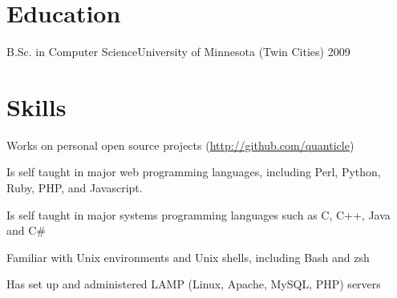 \documentclass[letterpaper]{article}
\newenvironment{resume-list}
{\begin{itemize}
 \setlength{\itemsep}{0pt}
 \setlength{\parskip}{0pt}}
{\end{itemize}}
\begin{document}
\section*{Education}
\noindent B.Sc. in Computer Science\dotfill University of Minnesota (Twin Cities) 2009\\
\section*{Skills}
\begin{resume-list}
\item Works on personal open source projects (\url{http://github.com/quanticle})
\item Is self taught in major web programming languages, including Perl, Python, Ruby, PHP, and Javascript.
\item Is self taught in major systems programming languages such as C, C++, Java and C\#
\item Familiar with Unix environments and Unix shells, including Bash and zsh
\item Has set up and administered LAMP (Linux, Apache, MySQL, PHP) servers
\end{resume-list}
\end{document}
